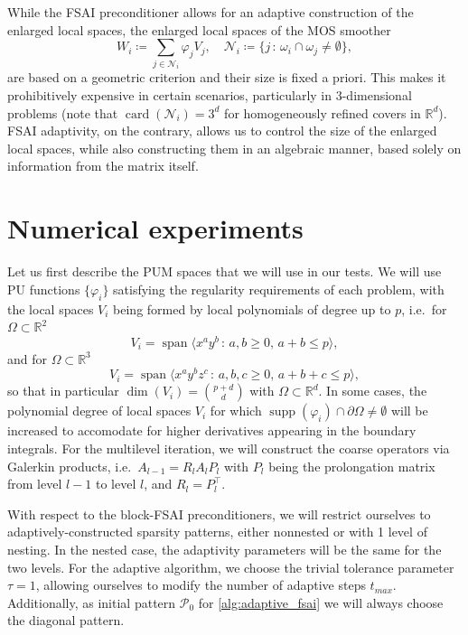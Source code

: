 \documentclass[a4paper]{article}
\DeclareMathOperator{\supp}{supp}
\theoremstyle{plain}
\theoremstyle{definition}
\theoremstyle{remark}
\begin{document}
While the FSAI preconditioner allows for an adaptive construction of the enlarged local spaces, the enlarged local spaces of the MOS smoother
\begin{equation*}
	W_i \coloneqq \sum_{j\in \mathcal{N}_i} \varphi_j V_j, \quad \mathcal{N}_i \coloneqq \{j \,\colon\, \omega_i \cap \omega_j \neq \emptyset\},
\end{equation*}
are based on a geometric criterion and their size is fixed a priori. This makes it prohibitively expensive in certain scenarios, particularly in 3-dimensional problems (note that \(\operatorname{card}(\mathcal{N}_i) = 3^d\) for homogeneously refined covers in \(\mathbb{R}^d\)). FSAI adaptivity, on the contrary, allows us to control the size of the enlarged local spaces, while also constructing them in an algebraic manner, based solely on information from the matrix itself.


\section{Numerical experiments}\label{sec:experiments}

Let us first describe the PUM spaces that we will use in our tests. We will use PU functions \(\{\varphi_i\}\) satisfying the regularity requirements of each problem, with the local spaces \(V_i\) being formed by local polynomials of degree up to \(p\), i.e.\ for \(\Omega \subset \mathbb{R}^2\)
\begin{equation*}
	V_i = \operatorname{span} \langle x^a y^b \,\colon\, a, b \geq 0,\, a + b \leq p \rangle,
\end{equation*}
and for \(\Omega \subset \mathbb{R}^3\)
\begin{equation*}
	V_i = \operatorname{span} \langle x^a y^b z^c \,\colon\, a,b,c \geq 0,\, a + b + c \leq p \rangle,
\end{equation*}
so that in particular \(\dim(V_i) = \binom{p+d}{d}\) with \(\Omega \subset \mathbb{R}^d\). In some cases, the polynomial degree of local spaces \(V_i\) for which \(\supp(\varphi_i) \cap \partial\Omega \neq \emptyset\) will be increased to accomodate for higher derivatives appearing in the boundary integrals. For the multilevel iteration, we will construct the coarse operators via Galerkin products, i.e.\ \(A_{l-1} = R_l A_l P_l\) with \(P_l\) being the prolongation matrix from level \(l-1\) to level \(l\), and \(R_l = P_l^{\top}\).

With respect to the block-FSAI preconditioners, we will restrict ourselves to adaptively-constructed sparsity patterns, either nonnested or with 1 level of nesting. In the nested case, the adaptivity parameters will be the same for the two levels. For the adaptive algorithm, we choose the trivial tolerance parameter \(\tau = 1\), allowing ourselves to modify the number of adaptive steps \(t_{max}\). Additionally, as initial pattern \(\mathcal{P}_0\) for \cref{alg:adaptive_fsai} we will always choose the diagonal pattern.
\end{document}
